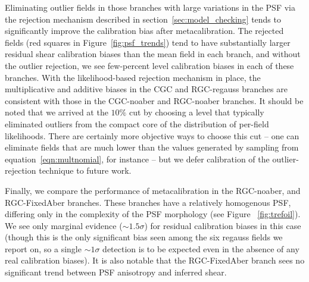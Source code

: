 \documentclass[iop]{emulateapj}
\newcommand\rmcomment[1]{\textcolor{red}{(RM: #1)}}
\begin{document}
Eliminating outlier fields in those branches with large variations in
the PSF via the rejection mechanism described in
section~\ref{sec:model_checking} tends to significantly improve the
calibration bias after metacalibration. The rejected fields (red
squares in Figure~\ref{fig:psf_trends}) tend to have substantially
larger residual shear calibration biases than the mean field in each
branch, and without the outlier rejection, we see few-percent level
calibration biases in each of these branches. With the likelihood-based 
rejection mechanism in place, the multiplicative and additive biases
in the CGC and RGC-regauss branches are consistent with those in the
CGC-noaber and RGC-noaber branches. It should be noted that we arrived
at the $10\%$ cut by choosing a level that typically eliminated
outliers from the compact core of the distribution of per-field
likelihoods. There are certainly more objective ways to choose this
cut -- one can eliminate fields that are much lower than the values
generated by sampling from equation~\eqref{eqn:multnomial}, for instance
-- but we defer calibration of the outlier-rejection technique to future work.


Finally, we compare the performance of metacalibration in the
RGC-noaber, and RGC-FixedAber branches. These branches have a
relatively homogenous PSF, differing only in the complexity of the PSF
morphology (see Figure ~\ref{fig:trefoil}). We see only marginal
evidence ($\sim1.5\sigma$) for residual calibration biases in this
case (though this is the only significant bias seen among the six
regauss fields we report on, so a single $\sim1\sigma$ detection
is to be expected even in the absence of any real calibration
biases). It is also notable that the RGC-FixedAber branch sees no
significant trend between PSF anisotropy and inferred shear.
\end{document}
